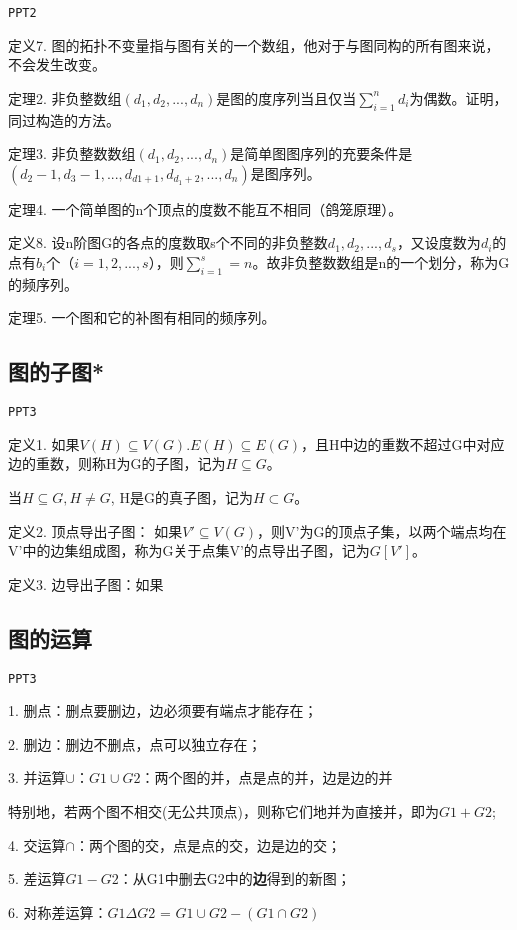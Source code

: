 \documentclass{article}
\begin{document}
\texttt{PPT2}

定义7. 图的拓扑不变量指与图有关的一个数组，他对于与图同构的所有图来说，不会发生改变。

定理2. 非负整数组$(d_1,d_2,...,d_n)$是图的度序列当且仅当$\sum_{i = 1}^n d_i$为偶数。证明，同过构造的方法。

定理3. 非负整数数组$(d_1,d_2,...,d_n)$是简单图图序列的充要条件是$(d_2-1,d_3-1,...,d_{d1+1},d_{d_1+2},...,d_n)$是图序列。

定理4. 一个简单图的n个顶点的度数不能互不相同（鸽笼原理）。

定义8. 设n阶图G的各点的度数取s个不同的非负整数$d_1,d_2,...,d_s$，又设度数为$d_i$的点有$b_i$个（$i = 1,2,...,s$），则$\sum_{i=1}^s = n$。故非负整数数组是n的一个划分，称为G的频序列。

定理5. 一个图和它的补图有相同的频序列。

\subsection{图的子图*}

\texttt{PPT3}

定义1. 如果$V(H) \subseteq V(G). E(H) \subseteq E(G)$，且H中边的重数不超过G中对应边的重数，则称H为G的子图，记为$H \subseteq G$。

\quad 当$H \subseteq G, H \ne G$, H是G的真子图，记为$H \subset G$。

定义2. 顶点导出子图： 如果$V' \subseteq V(G)$，则V'为G的顶点子集，以两个端点均在V'中的边集组成图，称为G关于点集V'的点导出子图，记为$G[V']$。

定义3. 边导出子图：如果

\subsection{图的运算}

\texttt{PPT3}

1. 删点：删点要删边，边必须要有端点才能存在；

2. 删边：删边不删点，点可以独立存在；

3. 并运算$\cup$：$G1 \cup G2$：两个图的并，点是点的并，边是边的并

特别地，若两个图不相交(无公共顶点)，则称它们地并为直接并，即为$G1+G2$;

4. 交运算$\cap$：两个图的交，点是点的交，边是边的交；

5. 差运算$G1-G2$：从G1中删去G2中的\textbf{边}得到的新图；

6. 对称差运算：$G1 \Delta G2$ = $G1\cup G2 - (G1 \cap G2)$
\end{document}
